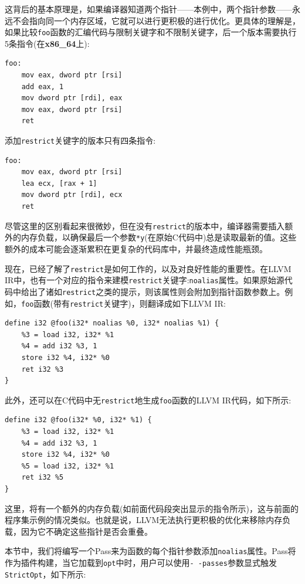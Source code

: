这背后的基本原理是，如果编译器知道两个指针——本例中，两个指针参数——永远不会指向同一个内存区域，它就可以进行更积极的进行优化。更具体的理解是，如果比较\texttt{foo}函数的汇编代码与限制关键字和不限制关键字，后一个版本需要执行5条指令(在\textbf{x86\_64}上):

\begin{lstlisting}[style=stylePython]
foo:
	mov eax, dword ptr [rsi]
	add eax, 1
	mov dword ptr [rdi], eax
	mov eax, dword ptr [rsi]
	ret
\end{lstlisting}

添加\texttt{restrict}关键字的版本只有四条指令:

\begin{lstlisting}[style=stylePython]
foo:
	mov eax, dword ptr [rsi]
	lea ecx, [rax + 1]
	mov dword ptr [rdi], ecx
	ret
\end{lstlisting}

尽管这里的区别看起来很微妙，但在没有\texttt{restrict}的版本中，编译器需要插入额外的内存负载，以确保最后一个参数\texttt{*y}(在原始C代码中)总是读取最新的值。这些额外的成本可能会逐渐累积在更复杂的代码库中，并最终造成性能瓶颈。

现在，已经了解了\texttt{restrict}是如何工作的，以及对良好性能的重要性。在LLVM IR中，也有一个对应的指令来建模\texttt{restrict}关键字:\texttt{noalias}属性。如果原始源代码中给出了诸如\texttt{restrict}之类的提示，则该属性则会附加到指针函数参数上。例如，\texttt{foo}函数(带有\texttt{restrict}关键字)，则翻译成如下LLVM IR:

\begin{lstlisting}[style=stylePython]
define i32 @foo(i32* noalias %0, i32* noalias %1) {
	%3 = load i32, i32* %1
	%4 = add i32 %3, 1
	store i32 %4, i32* %0
	ret i32 %3
}
\end{lstlisting}

此外，还可以在C代码中无\texttt{restrict}地生成\texttt{foo}函数的LLVM IR代码，如下所示:

\begin{lstlisting}[style=stylePython]
define i32 @foo(i32* %0, i32* %1) {
	%3 = load i32, i32* %1
	%4 = add i32 %3, 1
	store i32 %4, i32* %0
	%5 = load i32, i32* %1
	ret i32 %5
}
\end{lstlisting}

这里，将有一个额外的内存负载(如前面代码段突出显示的指令所示)，这与前面的程序集示例的情况类似。也就是说，LLVM无法执行更积极的优化来移除内存负载，因为它不确定这些指针是否会重叠。

本节中，我们将编写一个Pass来为函数的每个指针参数添加\texttt{noalias}属性。Pass将作为插件构建，当它加载到\texttt{opt}中时，用户可以使用\texttt{-\,-passes}参数显式触发\texttt{StrictOpt}，如下所示:

